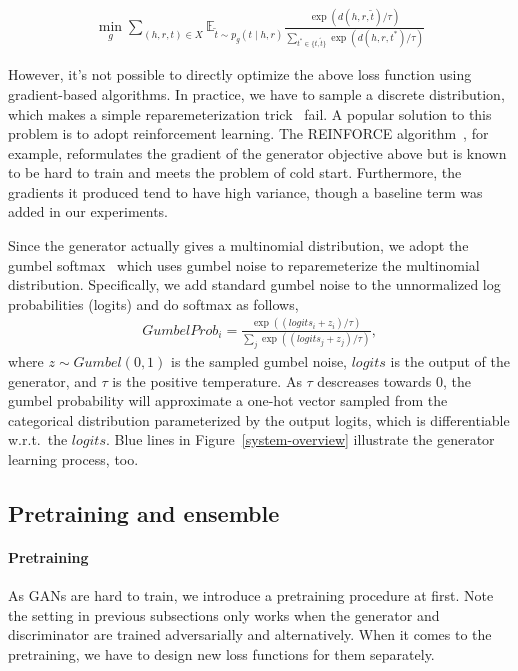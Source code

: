 \documentclass[twocolumn,a4paper,preprint,10pt,3p]{elsarticle}
\begin{document}
\begin{align}
    \min_g \sum_{(h, r, t)\in X}
        \mathbb{E}_{\tilde t \sim p_g(t \mid h, r)}
            \frac{\exp(d(h, r, \tilde t) / \tau)}
                 {\sum_{t^* \in \{ t, \tilde t\}} \exp(d(h, r, t^*) / \tau)} \label{eq:g_loss}
\end{align}

However, it's not possible to directly optimize the above loss function using gradient-based algorithms. In practice, we have to sample a discrete distribution, which makes a simple reparemeterization trick~\cite{VAE} fail. A popular solution to this problem is to adopt reinforcement learning. The REINFORCE algorithm~\cite{Williams_1992}, for example, reformulates the gradient of the generator objective above but is known to be hard to train and meets the problem of cold start. Furthermore, the gradients it produced tend to have high variance, though a baseline term was added in our experiments.

Since the generator actually gives a multinomial distribution, we adopt the gumbel softmax~\cite{GumbelSoftmax_Jiang_2016} which uses gumbel noise to reparemeterize the multinomial distribution. Specifically, we add standard gumbel noise to the unnormalized log probabilities (logits) and do softmax as follows,
\begin{align}
    GumbelProb_i = \frac{\exp((logits_i + z_i)/ \tau)}{\sum_{j}\exp((logits_j + z_j)/ \tau)}, \label{eq:gumbel-softmax}
\end{align}
where $z \sim Gumbel(0, 1)$ is the sampled gumbel noise, $logits$ is the output of the generator, and $\tau$ is the positive temperature. As $\tau$ descreases towards 0, the gumbel probability will approximate a one-hot vector sampled from the categorical distribution parameterized by the output logits, which is differentiable w.r.t.\ the $logits$. Blue lines in Figure~\ref{system-overview} illustrate the generator learning process, too.


\subsection{Pretraining and ensemble}

\paragraph{Pretraining} As GANs are hard to train, we introduce a pretraining procedure at first. Note the setting in previous subsections only works when the generator and discriminator are trained adversarially and alternatively. When it comes to the pretraining, we have to design new loss functions for them separately.
\end{document}
